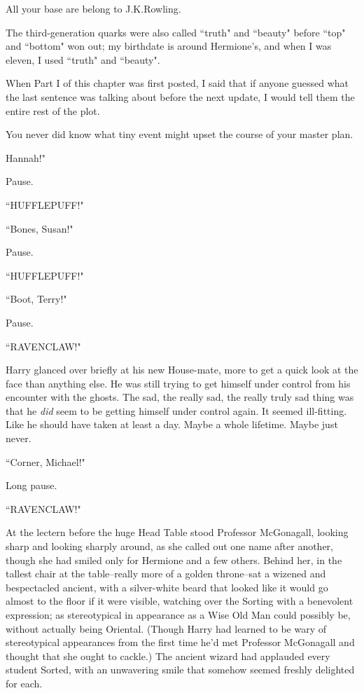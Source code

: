
\begin{chapterOpeningAuthorNote}
All your base are belong to J.\?K.\?Rowling.



The third-generation quarks were also called ``truth" and ``beauty" before ``top" and ``bottom" won out; my birthdate is around Hermione's, and when I was eleven, I used ``truth" and ``beauty".

When Part I of this chapter was first posted, I said that if anyone guessed what the last sentence was talking about before the next update, I would tell them the entire rest of the plot.
\end{chapterOpeningAuthorNote}
\begin{chapterOpeningQuote}
You never did know what tiny event might upset the course of your master plan.
\end{chapterOpeningQuote}

 Hannah!"

\hplettrineextrapara
Pause.

``HUFFLEPUFF!"

``Bones, Susan!"

Pause.

``HUFFLEPUFF!"

``Boot, Terry!"

Pause.

``RAVENCLAW!"

Harry glanced over briefly at his new House-mate, more to get a quick look at the face than anything else. He was still trying to get himself under control from his encounter with the ghosts. The sad, the really sad, the really truly sad thing was that he \emph{did} seem to be getting himself under control again. It seemed ill-fitting. Like he should have taken at least a day. Maybe a whole lifetime. Maybe just never.

``Corner, Michael!"

Long pause.

``RAVENCLAW!"

At the lectern before the huge Head Table stood Professor McGonagall, looking sharp and looking sharply around, as she called out one name after another, though she had smiled only for Hermione and a few others. Behind her, in the tallest chair at the table\---really more of a golden throne\---sat a wizened and bespectacled ancient, with a silver-white beard that looked like it would go almost to the floor if it were visible, watching over the Sorting with a benevolent expression; as stereotypical in appearance as a Wise Old Man could possibly be, without actually being Oriental. (Though Harry had learned to be wary of stereotypical appearances from the first time he'd met Professor McGonagall and thought that she ought to cackle.) The ancient wizard had applauded every student Sorted, with an unwavering smile that somehow seemed freshly delighted for each.


